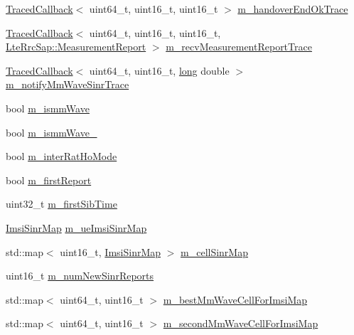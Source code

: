 \begin{DoxyCompactItemize}
\item 
\hyperlink{classns3_1_1TracedCallback}{Traced\+Callback}$<$ uint64\+\_\+t, uint16\+\_\+t, uint16\+\_\+t $>$ \hyperlink{classns3_1_1LteEnbRrc_afbb60c6381e72a45c833d2940fb64bdc}{m\+\_\+handover\+End\+Ok\+Trace}
\item 
\hyperlink{classns3_1_1TracedCallback}{Traced\+Callback}$<$ uint64\+\_\+t, uint16\+\_\+t, uint16\+\_\+t, \hyperlink{structns3_1_1LteRrcSap_1_1MeasurementReport}{Lte\+Rrc\+Sap\+::\+Measurement\+Report} $>$ \hyperlink{classns3_1_1LteEnbRrc_a88f4bfb8909dde7fd5bcd6af575139ba}{m\+\_\+recv\+Measurement\+Report\+Trace}
\item 
\hyperlink{classns3_1_1TracedCallback}{Traced\+Callback}$<$ uint64\+\_\+t, uint16\+\_\+t, \hyperlink{generate__test__data__lte__sinr_8m_a0eab6be67e93c3411f7a8b53cc297285}{long} double $>$ \hyperlink{classns3_1_1LteEnbRrc_a9521b7ea53f746753963a62c5b353d43}{m\+\_\+notify\+Mm\+Wave\+Sinr\+Trace}
\item 
bool \hyperlink{classns3_1_1LteEnbRrc_a44515fc06d16f2b477afe0c05425e206}{m\+\_\+ismm\+Wave}
\item 
bool \hyperlink{classns3_1_1LteEnbRrc_aec01489e207e9c5f0d8a64dfe5ffe67c}{m\+\_\+ismm\+Wave\+\_}
\item 
bool \hyperlink{classns3_1_1LteEnbRrc_a25849018e31a7766dfc839663e4c5ca4}{m\+\_\+inter\+Rat\+Ho\+Mode}
\item 
bool \hyperlink{classns3_1_1LteEnbRrc_afa7c3d62a87abb384175401d9a64ed22}{m\+\_\+first\+Report}
\item 
uint32\+\_\+t \hyperlink{classns3_1_1LteEnbRrc_a157db9af74b393f8f3f1d78b44e683f5}{m\+\_\+first\+Sib\+Time}
\item 
\hyperlink{namespacens3_ab6cc151fead3de33fa35b3fdd609a633}{Imsi\+Sinr\+Map} \hyperlink{classns3_1_1LteEnbRrc_ace21a7a862af010882cbfd9f8ccdcfd2}{m\+\_\+ue\+Imsi\+Sinr\+Map}
\item 
std\+::map$<$ uint16\+\_\+t, \hyperlink{namespacens3_ab6cc151fead3de33fa35b3fdd609a633}{Imsi\+Sinr\+Map} $>$ \hyperlink{classns3_1_1LteEnbRrc_a50206cc0822bd3ec37ef2108735f44f2}{m\+\_\+cell\+Sinr\+Map}
\item 
uint16\+\_\+t \hyperlink{classns3_1_1LteEnbRrc_ab624d5f95716cc624e69f41f430dd8db}{m\+\_\+num\+New\+Sinr\+Reports}
\item 
std\+::map$<$ uint64\+\_\+t, uint16\+\_\+t $>$ \hyperlink{classns3_1_1LteEnbRrc_a38d5bf3d53b16596824f07d4b4a1eab7}{m\+\_\+best\+Mm\+Wave\+Cell\+For\+Imsi\+Map}
\item 
std\+::map$<$ uint64\+\_\+t, uint16\+\_\+t $>$ \hyperlink{classns3_1_1LteEnbRrc_ad32cb1587ac3d86749575bbb747b9071}{m\+\_\+second\+Mm\+Wave\+Cell\+For\+Imsi\+Map}

\end{DoxyCompactItemize}
